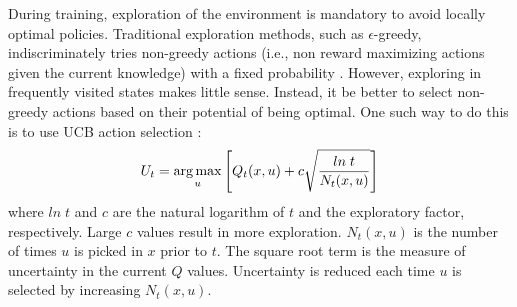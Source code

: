 During training, exploration of the environment is mandatory to avoid locally optimal policies. Traditional exploration methods, such as $\epsilon$-greedy, indiscriminately tries non-greedy actions (i.e., non reward maximizing actions given the current knowledge) with a fixed probability \cite{sutton}. However, exploring in frequently visited states makes little sense. Instead, it be better to select non-greedy actions based on their potential of being optimal. One such way to do this is to use UCB action selection \cite{sutton}:
\begin{equation}
    U_t = \operatorname*{arg\,max}_u \left[Q_t(x, u) + c \sqrt{\frac{ln \; t}{N_t(x, u)}} \right]
\label{eq:ucb}
\end{equation}
where $ln \; t$ and $c$ are the natural logarithm of $t$ and the exploratory factor, respectively. Large $c$ values result in more exploration. $N_t(x, u)$ is the number of times $u$ is picked in $x$ prior to $t$.  The square root term is the measure of uncertainty in the current $Q$ values.  Uncertainty is reduced each time $u$ is selected by increasing $N_t(x, u)$.

